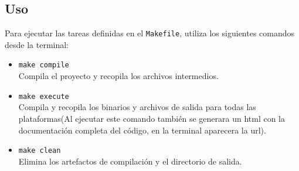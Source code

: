 \documentclass[a4paper, 12pt]{article}
\begin{document}
\subsection{Uso}

Para ejecutar las tareas definidas en el \texttt{Makefile}, utiliza los siguientes comandos desde la terminal:

\begin{itemize}
  \item \texttt{make compile} \hfill \\
        Compila el proyecto y recopila los archivos intermedios.
  \item \texttt{make execute} \hfill \\
        Compila y recopila los binarios y archivos de salida para todas las plataformas(Al ejecutar este comando también se generara un html con la documentación completa del código, en la terminal aparecera la url).
  \item \texttt{make clean} \hfill \\
        Elimina los artefactos de compilación y el directorio de salida.
\end{itemize}
\end{document}

